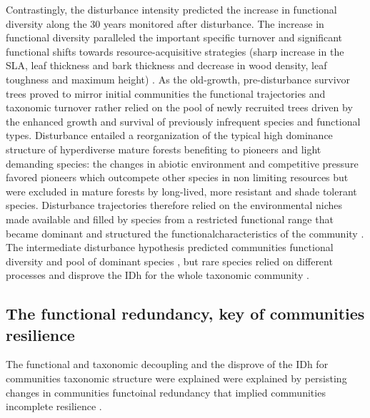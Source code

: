 \documentclass[fleqn,10pt]{ArtEcoFoG} %
\theoremstyle{definition}
\theoremstyle{definition}
\theoremstyle{definition}
\theoremstyle{remark}
\begin{document}
Contrastingly, the disturbance intensity predicted the increase in
functional diversity along the 30 years monitored after disturbance. The
increase in functional diversity paralleled the important specific
turnover and significant functional shifts towards resource-acquisitive
strategies (sharp increase in the SLA, leaf thickness and bark thickness
and decrease in wood density, leaf toughness and maximum height)
\citep{Westoby1998, Wright2004, Reich2014}. As the old-growth,
pre-disturbance survivor trees proved to mirror initial communities
\citep{Herault2018} the functional trajectories and taxonomic turnover
rather relied on the pool of newly recruited trees driven by the
enhanced growth and survival of previously infrequent species and
functional types. Disturbance entailed a reorganization of the typical
high dominance structure of hyperdiverse mature forests benefiting to
pioneers and light demanding species: the changes in abiotic environment
and competitive pressure favored pioneers which outcompete other species
in non limiting resources but were excluded in mature forests by
long-lived, more resistant and shade tolerant species. Disturbance
trajectories therefore relied on the environmental niches made available
and filled by species from a restricted functional range that became
dominant and structured the functionalcharacteristics of the community
\citep{Grime1998}. The intermediate disturbance hypothesis predicted
communities functional diversity and pool of dominant species
\citep{Molino2001}, but rare species relied on different processes and
disprove the IDh for the whole taxonomic community
\citep{Hubbell2001, Chave2004}.

\subsection{The functional redundancy, key of communities
resilience}\label{the-functional-redundancy-key-of-communities-resilience}

The functional and taxonomic decoupling and the disprove of the IDh for
communities taxonomic structure were explained were explained by
persisting changes in communities functoinal redundancy that implied
communities incomplete resilience
\citep{Trenbath1999, Elmqvist2003, Diaz2005}.
\end{document}
